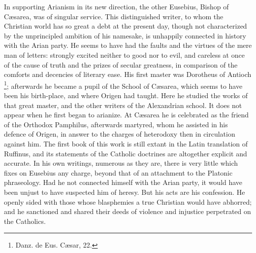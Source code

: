 In supporting Arianism in its new direction, the other Eusebius,
Bishop of Cæsarea, was of singular service. This distinguished
writer, to whom the Christian world has so great a debt at the present
day, though not characterized by the unprincipled ambition of his
namesake, is unhappily connected in history with the Arian
party. He seems to have had the faults and the virtues of the mere man
of letters: strongly excited neither to good nor to evil, and careless
at once of the cause of truth and the prizes of secular greatness, in
comparison of the comforts and decencies of literary ease. His first
master was Dorotheus of Antioch \footnote{Danz. de Eus. Cæsar, 22.}; afterwards he became a pupil of the School of Cæsarea, which
seems to have been his birth-place, and where Origen had taught. Here
he studied the works of that great master, and the other writers of
the Alexandrian school. It does not appear when he first began to
arianize. At Cæsarea he is celebrated as the friend of the Orthodox
Pamphilus, afterwards martyred, whom he assisted in his defence of
Origen, in answer to the charges of heterodoxy then in circulation
against him. The first book of this work is still extant in the Latin
translation of Ruffinus, and its statements of the Catholic doctrines
are altogether explicit and accurate. In his own writings, numerous as
they are, there is very little which fixes on Eusebius any charge,
beyond that of an attachment to the Platonic phraseology. Had he not
connected himself with the Arian party, it would have been unjust to
have suspected him of heresy. But his acts are his confession. He
openly sided with those whose blasphemies a true Christian would have
abhorred; and he sanctioned and shared their deeds of violence and
injustice perpetrated on the Catholics.

